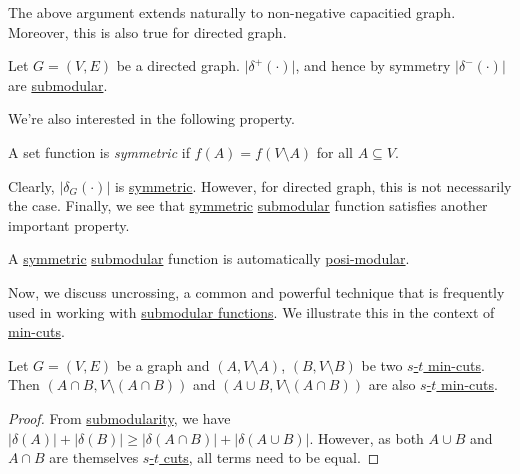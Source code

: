 The above argument extends naturally to non-negative capacitied graph. Moreover, this is also true for directed graph.

\begin{eg}
	Let \(G=(V, E)\) be a directed graph. \(\lvert \delta ^{+} (\cdot) \rvert \), and hence by symmetry \(\lvert \delta ^{-} (\cdot)\rvert \) are \hyperref[def:submodular]{submodular}.
\end{eg}

We're also interested in the following property.

\begin{definition}[Symmetric]\label{def:symmetric}
	A set function is \emph{symmetric} if \(f(A) = f(V\setminus A)\) for all \(A \subseteq V\).
\end{definition}

Clearly, \(\lvert \delta _G(\cdot ) \rvert \) is \hyperref[def:symmetric]{symmetric}. However, for directed graph, this is not necessarily the case. Finally, we see that \hyperref[def:symmetric]{symmetric} \hyperref[def:submodular]{submodular} function satisfies another important property.

\begin{eg}
	A \hyperref[def:symmetric]{symmetric} \hyperref[def:submodular]{submodular} function is automatically \hyperref[def:posi-modular]{posi-modular}.
\end{eg}

Now, we discuss uncrossing, a common and powerful technique that is frequently used in working with \hyperref[def:submodular]{submodular functions}. We illustrate this in the context of \hyperref[prb:global-min-cut]{min-cuts}.

\begin{lemma}\label{lma:union-intersection-min-cut}
	Let \(G = (V, E)\) be a graph and \((A, V\setminus A)\), \((B, V\setminus B)\) be two \hyperref[prb:s-t-min-cut]{\(s\)-\(t\) min-cuts}. Then \((A \cap B, V\setminus (A \cap B))\) and \((A \cup B, V \setminus (A \cap B))\) are also \hyperref[prb:s-t-min-cut]{\(s\)-\(t\) min-cuts}.
\end{lemma}
\begin{proof}
	From \hyperref[def:submodular]{submodularity}, we have \(\lvert \delta (A) \rvert + \lvert \delta (B) \rvert \geq \lvert \delta (A \cap B) \rvert + \lvert \delta (A \cup B) \rvert \). However, as both \(A \cup B\) and \(A \cap B\) are themselves \hyperref[prb:s-t-min-cut]{\(s\)-\(t\) cuts}, all terms need to be equal.
\end{proof}

